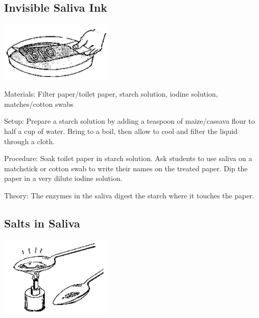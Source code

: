 \begin{multicols}{2}
\subsection{Invisible Saliva Ink}  %

\begin{center}
\includegraphics[width=0.4\textwidth]{./img/source/saliva-ink.png}
\end{center}

\begin{description*}
\item[Materials:]{Filter paper/toilet paper, starch solution, iodine solution, matches/cotton swabs}
\item[Setup:]{Prepare a starch solution by adding a teaspoon of maize/cassava flour to half a
cup of water. Bring to a boil, then allow to cool and filter the liquid through a cloth.}
\item[Procedure:]{Soak toilet paper in starch solution. Ask students to use saliva on a matchstick or cotton swab to write their names on the treated paper. Dip the paper in a very dilute iodine solution.}
\item[Theory:]{The enzymes in the saliva digest the starch where it touches the paper.}
\end{description*}

\subsection{Salts in Saliva} %

\begin{center}
\includegraphics[width=0.4\textwidth]{./img/source/saliva-salts.png}
\end{center}


\end{multicols}
